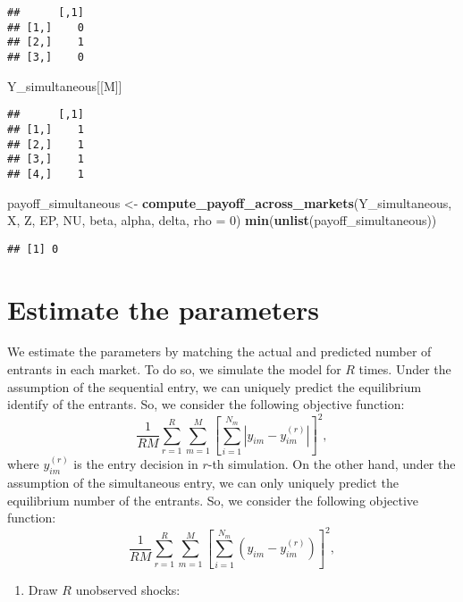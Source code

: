 \documentclass[
]{book}
\newenvironment{Shaded}{\begin{snugshade}}{\end{snugshade}}
\newcommand{\DataTypeTok}[1]{\textcolor[rgb]{0.13,0.29,0.53}{#1}}
\newcommand{\DecValTok}[1]{\textcolor[rgb]{0.00,0.00,0.81}{#1}}
\newcommand{\KeywordTok}[1]{\textcolor[rgb]{0.13,0.29,0.53}{\textbf{#1}}}
\newcommand{\NormalTok}[1]{#1}
\newcommand{\StringTok}[1]{\textcolor[rgb]{0.31,0.60,0.02}{#1}}
\providecommand{\tightlist}{%
  \setlength{\itemsep}{0pt}\setlength{\parskip}{0pt}}
\begin{document}
\begin{verbatim}
##      [,1]
## [1,]    0
## [2,]    1
## [3,]    0
\end{verbatim}

\begin{Shaded}
\begin{Highlighting}[]
\NormalTok{Y_simultaneous[[M]]}
\end{Highlighting}
\end{Shaded}

\begin{verbatim}
##      [,1]
## [1,]    1
## [2,]    1
## [3,]    1
## [4,]    1
\end{verbatim}

\begin{Shaded}
\begin{Highlighting}[]
\NormalTok{payoff_simultaneous <-}
\StringTok{  }\KeywordTok{compute_payoff_across_markets}\NormalTok{(Y_simultaneous, X, Z, EP, NU, beta, alpha, delta, }\DataTypeTok{rho =} \DecValTok{0}\NormalTok{)}
\KeywordTok{min}\NormalTok{(}\KeywordTok{unlist}\NormalTok{(payoff_simultaneous))}
\end{Highlighting}
\end{Shaded}

\begin{verbatim}
## [1] 0
\end{verbatim}

\hypertarget{estimate-the-parameters}{%
\section{Estimate the parameters}\label{estimate-the-parameters}}

We estimate the parameters by matching the actual and predicted number of entrants in each market. To do so, we simulate the model for \(R\) times.
Under the assumption of the sequential entry, we can uniquely predict the equilibrium identify of the entrants. So, we consider the following objective function:
\[
\frac{1}{RM}\sum_{r = 1}^R \sum_{m = 1}^M \left[\sum_{i = 1}^{N_m}|y_{im} - y_{im}^{(r)}| \right]^2,
\]
where \(y_{im}^{(r)}\) is the entry decision in \(r\)-th simulation. On the other hand, under the assumption of the simultaneous entry, we can only uniquely predict the equilibrium number of the entrants. So, we consider the following objective function:
\[
\frac{1}{RM}\sum_{r = 1}^R \sum_{m = 1}^M \left[\sum_{i = 1}^{N_m}(y_{im} - y_{im}^{(r)}) \right]^2,
\]

\begin{enumerate}
\def\labelenumi{\arabic{enumi}.}
\tightlist
\item
  Draw \(R\) unobserved shocks:
\end{enumerate}
\end{document}
